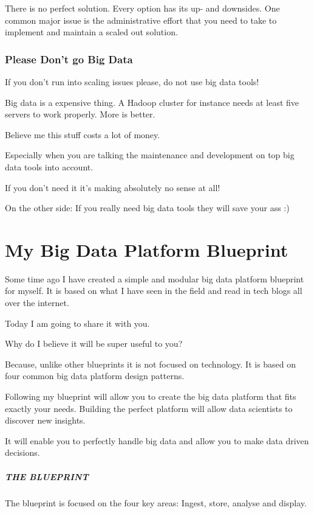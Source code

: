 \documentclass[12pt, numbers=noenddot]{scrreprt} %
\begin{document}
There is no perfect solution. Every option has its up- and downsides. One common major issue is the administrative effort that you need to take to implement and maintain a scaled out solution.

\subsection{Please Don’t go Big Data}

If you don’t run into scaling issues please, do not use big data tools!

Big data is a expensive thing. A Hadoop cluster for instance needs at least five servers to work properly. More is better.

Believe me this stuff costs a lot of money.

Especially when you are talking the maintenance and development on top big data tools into account.

If you don’t need it it’s making absolutely no sense at all!

On the other side: If you really need big data tools they will save your ass :)

\chapter {My Big Data Platform Blueprint}
Some time ago I have created a simple and modular big data platform blueprint for myself. It is based on what I have seen in the field and read in tech blogs all over the internet.

Today I am going to share it with you.

Why do I believe it will be super useful to you?

Because, unlike other blueprints it is not focused on technology. It is based on four common big data platform design patterns.

Following my blueprint will allow you to create the big data platform that fits exactly your needs. Building the perfect platform will allow data scientists to discover new insights.

It will enable you to perfectly handle big data and allow you to make data driven decisions.

\paragraph{THE BLUEPRINT}
The blueprint is focused on the four key areas: Ingest, store, analyse and display.
\end{document}
